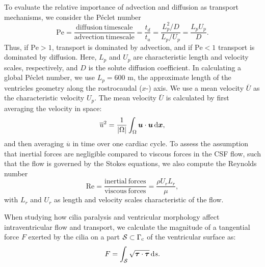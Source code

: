 \documentclass{WileyMSP-template}
\begin{document}
To evaluate the relative importance of advection and
diffusion as transport mechanisms, we consider the Péclet number
\begin{equation*}
    \mathrm{Pe} = \frac{\mathrm{diffusion \ timescale}}{\mathrm{advection \ timescale}}
    = \frac{t_d}{t_a} = \frac{L_p^2/D}{L_p/U_p} = \frac{L_p U_p}{D}.
\end{equation*}
Thus, if $\mathrm{Pe} > 1$, transport is dominated by advection,
and if $\mathrm{Pe} < 1$ transport is dominated by diffusion.
Here, $L_p$ and $U_p$ are characteristic length and velocity scales,
respectively, and $D$ is the solute diffusion coefficient.
In calculating a global Péclet number, we use $L_p=600$ \textmu m, the approximate length of the
ventricles geometry along the rostrocaudal ($x$-) axis.
We use a mean velocity $\overline{U}$ as the characteristic velocity $U_p$.
The mean velocity $\overline{U}$ is calculated by first averaging the velocity in space:
\begin{equation*}
    \overline{u}^2 = \frac{1}{|\Omega|}\int_{\Omega}\bm{u}\cdot\bm{u}\, \mathrm d\bm{x},
\end{equation*}
and then averaging $\overline{u}$ in time over one cardiac cycle.
To assess the assumption that inertial forces are negligible compared to
viscous forces in the CSF flow, such that the flow is governed by the Stokes equations,
we also compute the Reynolds number
\begin{equation*}
    \mathrm{Re} = \frac{\mathrm{inertial \ forces}}{\mathrm{viscous \ forces}} = \frac{\rho U_r L_r}{\mu},
\end{equation*}
with $L_r$ and $U_r$ as length and velocity scales characteristic of the flow. 

When studying how cilia paralysis and ventricular morphology affect intraventricular
flow and transport, we calculate the magnitude of a tangential force $F$ 
exerted by the cilia on a part $\mathcal{S}\subset\Gamma_{\mathrm{c}}$ of the ventricular surface as:
\begin{equation}
    F = \int_{\mathcal{S}}\sqrt{\bm{\tau}\cdot\bm{\tau}}\,\mathrm ds.
    \label{eq:tangential_force_calculation}
\end{equation}

\end{document}
